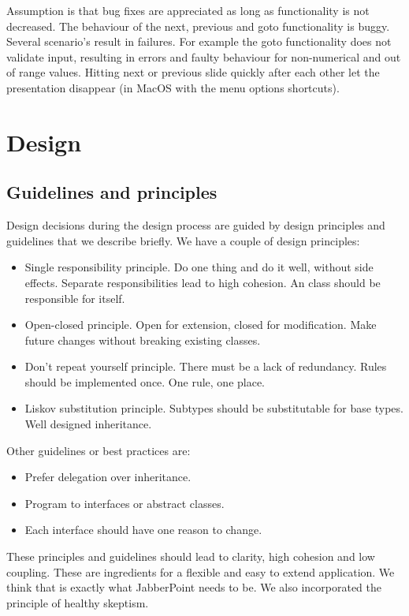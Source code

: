 \documentclass[a4paper]{article}
\begin{document}
Assumption is that bug fixes are appreciated as long as functionality is not decreased. The behaviour of the next, previous and goto functionality is buggy. Several scenario's result in failures. For example the goto functionality does not validate input, resulting in errors and faulty behaviour for non-numerical and out of range values. Hitting next or previous slide quickly after each other let the presentation disappear (in MacOS with the menu options shortcuts).   

\section{Design}
\subsection{Guidelines and principles} 
Design decisions during the design process are guided by design principles and guidelines that we describe briefly.
We have a couple of design principles:
\begin{itemize}
\item Single responsibility principle. Do one thing and do it well, without side effects. Separate responsibilities lead to high cohesion. An class should be responsible for itself.
\item Open-closed principle. Open for extension, closed for modification. Make future changes without breaking existing classes.
\item Don't repeat yourself principle. There must be a lack of redundancy. Rules should be implemented once. One rule, one place.
\item Liskov substitution principle. Subtypes should be substitutable for base types. Well designed inheritance. 
\end{itemize}

Other guidelines or best practices are:
\begin{itemize}
\item Prefer delegation over inheritance.
\item Program to interfaces or abstract classes.
\item Each interface should have one reason to change.
\end{itemize}
These principles and guidelines should lead to clarity, high cohesion and low coupling. These are ingredients for a flexible and easy to extend application. We think that is exactly what JabberPoint needs to be. We also incorporated the principle of healthy skeptism.
\end{document}

